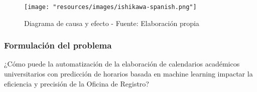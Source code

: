 
\begin{figure}[H]
    \centering
    \texttt{[image: "resources/images/ishikawa-spanish.png"]}
    \caption{Diagrama de causa y efecto - Fuente: Elaboración propia}
    \label{fig:ishikawa}
\end{figure}

\subsubsection{Formulación del problema}
¿Cómo puede la automatización de la elaboración de calendarios académicos universitarios con predicción de horarios basada en machine learning impactar la eficiencia y precisión de la Oficina de Registro?